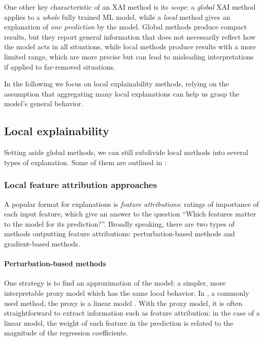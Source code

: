 \documentclass[../main.tex]{subfiles}
\begin{document}
One other key characteristic of an XAI method is its \emph{scope}: a \emph{global} XAI method applies to a \emph{whole} fully trained ML model, while a \emph{local} method gives an explanation of \emph{one prediction} by the model.
Global methods produce compact results, but they report general information that does not necessarily reflect
how the model acts in all situations, while local methods produce results with
a more limited range, which are more precise but can lead to misleading interpretations if applied to far-removed situations.


In the following we focus on local explainability methods, relying on the assumption that aggregating many local explanations can help us grasp the model's general behavior.

\subsection{Local explainability}

Setting aside global methods, we can still subdivide local methods into several types of explanation.
Some of them are outlined in \cite{bellePrinciples2021}:

\subsubsection{Local feature attribution approaches}

A popular format for explanations is \emph{feature attributions}: ratings of importance of each input feature, which give an answer to the question ``Which features matter to the model for its prediction?''.
Broadly speaking, there are two types of methods outputting feature attributions: perturbation-based methods and gradient-based methods.

\paragraph{Perturbation-based methods}

One strategy is to find an approximation of the model: a simpler, more interpretable proxy model which has the same local behavior. In , a commonly used method, the proxy is a linear model \cite{ribeiroWhy2016}.
With the proxy model, it is often straightforward to extract information such as feature attribution: in the case of a linear model, the weight of each feature in the prediction is related to the magnitude of the regression coefficients.
\end{document}
